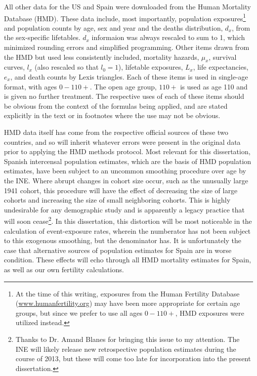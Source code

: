 All other data for the US and Spain were downloaded from the Human Mortality
Database (HMD)\citep{wilmoth2007methods}. These data include, most importantly,
population exposures\footnote{At the time of this writing, exposures from the
Human Fertility Database (\url{www.humanfertility.org}) may have been more
appropriate for certain age groups, but since we prefer to use all ages
$0-110+$, HMD exposures were utilized instead.} and population counts by age,
sex and year and the deaths distribution, $d_x$, from the sex-specific lifetables. $d_x$ informaion was 
always rescaled to sum to 1, which minimized rounding errors and simplified
programming. Other items drawn from the HMD but used less consistently
included, mortality hazards, $\mu_x$, survival curves, $l_x$ (also rescaled so that $l_0 = 1$), 
lifetable exposures, $L_x$,
life expectancies, $e_x$, and death counts by Lexis triangles. Each of these
items is used in single-age format, with ages $0-110+$. The open age group,
$110+$ is used as age 110 and is given no further treatment. The
respective uses of each of these items should be obvious from the context 
of the formulas being applied, and are stated explicitly in the text or in 
footnotes where the use may not be obvious.

HMD data itself has come from the respective official sources of these
two countries, and so will inherit whatever errors were present in the original
data prior to applying the HMD methods protocol. Most relevant for this
dissertation, Spanish intercensal population estimates, which are the basis of
HMD population estimates, have been subject to an uncommon smoothing
procedure over age by the INE. Where abrupt changes in cohort size occur, such
as the unusually large 1941 cohort, this procedure will have the effect of
decreasing the size of large cohorts and increasing the size of small neighboring cohorts. This is
highly undesirable for any demographic study and is apparently a legacy
practice that will soon cease\footnote{Thanks to Dr. Amand Blanes for bringing
this issue to my attention. The INE will likely release new retrospective
population estimates during the course of 2013, but these will come too late
for incorporation into the present dissertation.}. In this dissertation, this
distortion will be most noticeable in the calculation of event-exposure rates, 
wherein the numberator has not been subject to this exogenous smoothing, but 
the denominator has. It is unfortunately the case that alternative sources of 
population estimates for Spain are in worse condition. These effects will echo through all HMD mortality
estimates for Spain, as well as our own fertility calculations. 

